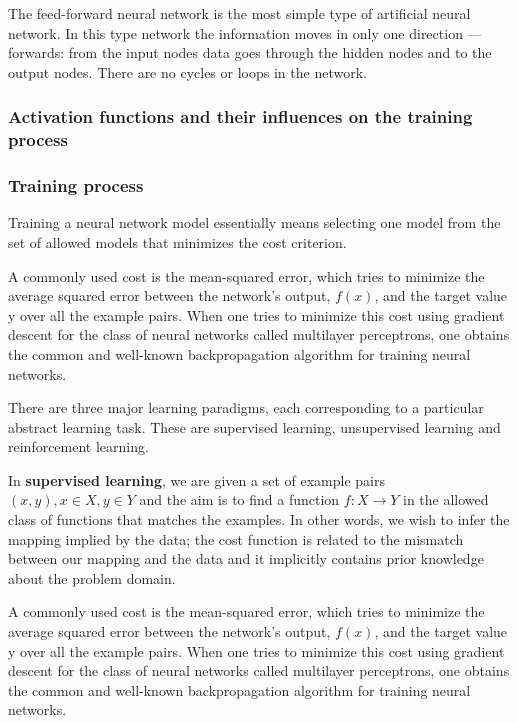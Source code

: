 \documentclass[a4paper,12pt]{article}
\begin{document}

The feed-forward neural network is the most simple type of artificial neural network. In this type network the information moves in only one direction — forwards: from the input nodes data goes through the hidden nodes and to the output nodes. There are no cycles or loops in the network.

\subsubsection{Activation functions and their influences on the training process}

\subsubsection{Training process}

Training a neural network model essentially means selecting one model from the set of allowed models that minimizes the cost criterion.

A commonly used cost is the mean-squared error, which tries to minimize the average squared error between the network's output, $f(x)$, and the target value y over all the example pairs. When one tries to minimize this cost using gradient descent for the class of neural networks called multilayer perceptrons, one obtains the common and well-known backpropagation algorithm for training neural networks.

There are three major learning paradigms, each corresponding to a particular abstract learning task. These are supervised learning, unsupervised learning and reinforcement learning.

In \textbf{supervised learning}, we are given a set of example pairs $ (x, y), x \in X, y \in Y $ and the aim is to find a function $ f : X \rightarrow Y $ in the allowed class of functions that matches the examples. In other words, we wish to infer the mapping implied by the data; the cost function is related to the mismatch between our mapping and the data and it implicitly contains prior knowledge about the problem domain.

A commonly used cost is the mean-squared error, which tries to minimize the average squared error between the network's output, $f(x)$, and the target value y over all the example pairs. When one tries to minimize this cost using gradient descent for the class of neural networks called multilayer perceptrons, one obtains the common and well-known backpropagation algorithm for training neural networks.
\end{document}
